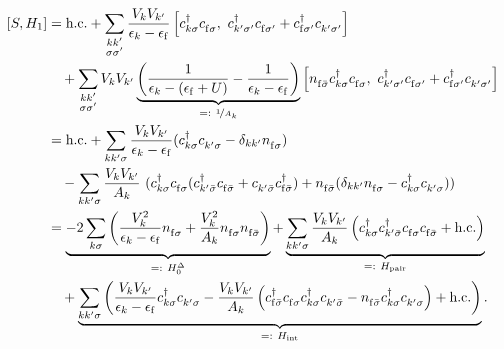\begin{align}
    \left[ S,  H_1 \right] &= \text{h.c.} + \sum_{\substack{k 
        k'\\\sigma\sigma'}} \frac{V_k V_{k'}}{\epsilon_k - \epsilon_\mathrm{f}} 
        \left[ \cre_{k \sigma} \anh_{\mathrm{f} \sigma},~ \cre_{k' \sigma'} 
        \anh_{\mathrm{f} \sigma'} + \cre_{\mathrm{f} \sigma'} \anh_{k' \sigma'} 
        \right] \\\nonumber
    &\quad+ \sum_{\substack{k k'\\\sigma \sigma'}} V_k V_{k'} 
        \underbrace{\left( \frac{1}{\epsilon_k - (\epsilon_\mathrm{f} + U)} - 
        \frac{1}{\epsilon_k - \epsilon_\mathrm{f}} 
        \right)}_{=:~\nicefrac{1}{A_k}} \left[ \numb_{\mathrm{f} \bar \sigma} 
        \cre_{k \sigma} \anh_{\mathrm{f} \sigma},~ \cre_{k' \sigma'} 
        \anh_{\mathrm{f} \sigma'} + \cre_{\mathrm{f} \sigma'} \anh_{k' \sigma'} 
        \right]\\
    &= \text{h.c.} + \sum_{k k' \sigma} \frac{V_k V_{k'}}{\epsilon_k - 
        \epsilon_\mathrm{f}} (\cre_{k \sigma} \anh_{k' \sigma} - \delta_{k k'} 
        \numb_{\mathrm{f} \sigma}) \\\nonumber
    &\quad- \sum_{k k' \sigma} \frac{V_k V_{k'}}{A_k} ~ ( \cre_{k \sigma} 
        \anh_{\mathrm{f} \sigma} (\cre_{k' \bar\sigma} \anh_{\mathrm{f} \bar 
        \sigma} + \anh_{k' \bar\sigma} \cre_{\mathrm{f} \bar\sigma}) + 
        \numb_{\mathrm{f} \bar\sigma} (\delta_{k k'} \numb_{\mathrm{f} \sigma} 
        - \cre_{k \sigma} \anh_{k' \sigma} ))\\
    &= \underbrace{-2\sum_{k \sigma} \left( \frac{V_k^2}{\epsilon_k - 
        \epsilon_\mathrm{f}} \numb_{\mathrm{f} \sigma} + \frac{V_k^2}{A_k} 
        \numb_{\mathrm{f} \sigma} \numb_{\mathrm{f} \bar\sigma} \right)}_{=:~ 
        H_0^\Delta}+ \underbrace{\sum_{k k' \sigma} \frac{V_k V_{k'}}{A_k} 
        \left(\cre_{k \sigma} \cre_{k' \bar\sigma} \anh_{\mathrm{f} \sigma} 
        \anh_{\mathrm{f} \bar\sigma} + \text{h.c.} 
        \right)}_{=:~H_\text{pair}}\\\nonumber
    &\quad+\underbrace{\sum_{k k' \sigma} \left( \frac{V_k V_{k'}}{\epsilon_k - 
        \epsilon_\mathrm{f}} \cre_{k \sigma} \anh_{k' \sigma} - \frac{V_k 
        V_{k'}}{A_k} \left(\cre_{\mathrm{f} \bar \sigma} \anh_{\mathrm{f} 
        \sigma} \cre_{k \sigma} \anh_{k' \bar\sigma} - \numb_{\mathrm{f} \bar 
        \sigma} \cre_{k \sigma} \anh_{k' \sigma} \right) + \text{h.c.} 
        \right)}_{=:~H_\text{int}}.
\end{align}

